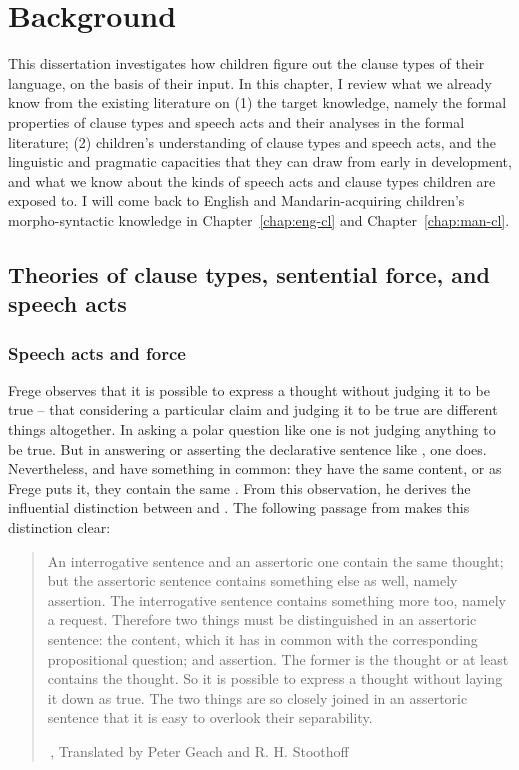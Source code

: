 \chapter{Background}
\label{chap:background}

This dissertation investigates how children figure out the clause types of their language, on the basis of their input. In this chapter, I review what we already know from the existing literature on (1) the target knowledge, namely the formal properties of clause types and speech acts and their analyses in the formal literature; (2) children's understanding of clause types and speech acts, and the linguistic and pragmatic capacities that they can draw from early in development, and what we know about the kinds of speech acts and clause types children are exposed to. I will come back to English and Mandarin-acquiring children's morpho-syntactic knowledge in Chapter~\ref{chap:eng-cl} and Chapter~\ref{chap:man-cl}.

\section{Theories of clause types, sentential force, and speech acts} \label{sec:bg:theory}


\subsection{Speech acts and force} \label{sec:bg:theory:speech}

Frege observes that it is possible to express a thought without judging it to be true -- that considering a particular claim and judging it to be true are different things altogether. In asking a polar question like  one is not judging anything to be true. But in answering or asserting the declarative sentence like , one does. Nevertheless,  and  have something in common: they have the same content, or as Frege puts it, they contain the same . From this observation, he derives the influential distinction between  and . The following passage from  makes this distinction clear:

\begin{quote}
    

An interrogative sentence and an assertoric one contain the same thought; but the assertoric sentence contains something else as well, namely assertion. The interrogative sentence contains something more too, namely a request. Therefore two things must be distinguished in an assertoric sentence: the content, which it has in common with the corresponding propositional question; and assertion. The former is the thought or at least contains the thought. So it is possible to express a thought without laying it down as true. The two things are so closely joined in an assertoric sentence that it is easy to overlook their separability. 

$\,$\hfill \cite[62]{frege1918thought}, Translated by Peter Geach and R. H. Stoothoff
\end{quote}

